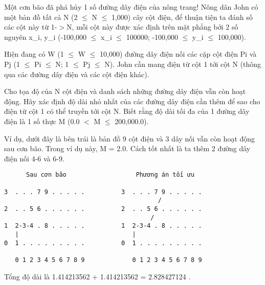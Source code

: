 Một cơn bão đã phá hủy 1 số đường dây điện của nông trang! Nông dân  John có một bản đồ tất cả N (2  $\le$  N  $\le$  1,000) cây cột điện, để thuận tiện ta đánh số các cột này từ 1-$>$N, mỗi cột này được xác định  trên mặt phẳng bởi 2 số nguyên x\_i,  y\_i (-100,000  $\le$  x\_i  $\le$  100000; -100,000  $\le$  y\_i  $\le$  100,000).  

   Hiện đang có W (1  $\le$  W  $\le$  10,000) đường dây điện nối các cặp cột điện  Pi và Pj (1  $\le$  Pi  $\le$  N; 1  $\le$  Pj  $\le$  N).  John cần mang điện từ cột 1 tới cột N (thông qua các đường dây điện và  các cột điện khác).  

   Cho tọa độ của N cột điện và danh sách những đường dây điện vẫn còn hoạt  động. Hãy xác định độ dài nhỏ nhất của các đường dây điện cần thêm để sao  cho điện từ cột 1 có thể truyền tới cột N. Biết rằng độ dài tối đa của  1 đường dây điện là 1 số thực M (0.0 $<$ M  $\le$  200,000.0).  

   Ví dụ, dưới đây là bên trái là bản đồ 9 cột điện và 3 dây nối vẫn còn hoạt động sau cơn bão. Trong ví dụ này, M = 2.0. Cách tốt nhất là ta thêm 2 đường dây điện nối 4-6 và 6-9.  
\begin{verbatim}
      Sau cơn bão                   Phương án tối ưu

3  . . . 7 9 . . . . .          3  . . . 7 9 . . . . .
                                          /
2  . . 5 6 . . . . . .          2  . . 5 6 . . . . . .
                                        /
1  2-3-4 . 8 . . . . .          1  2-3-4 . 8 . . . . .
   |                               |
0  1 . . . . . . . . .          0  1 . . . . . . . . .

   0 1 2 3 4 5 6 7 8 9             0 1 2 3 4 5 6 7 8 9
\end{verbatim}

   Tổng độ dài là 1.414213562 + 1.414213562 = 2.828427124 .